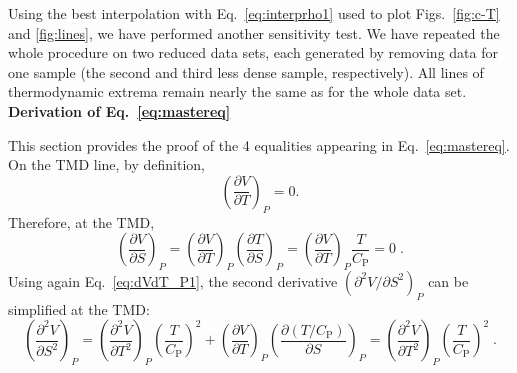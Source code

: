 \documentclass[12pt]{article}
\newcommand{\mrm}{\mathrm}
\newcommand{\CP}{C_\mrm{P}}
\begin{document}
Using the best interpolation with Eq.~\ref{eq:interprho1} used to plot Figs.~\ref{fig:c-T} and \ref{fig:lines}, we have performed another sensitivity test. We have repeated the whole procedure on two reduced data sets, each generated by removing data for one sample (the second and third less dense sample, respectively). All lines of thermodynamic extrema remain nearly the same as for the whole data set.
\\

\textbf{Derivation of Eq.~\ref{eq:mastereq}}

This section provides the proof of the 4 equalities appearing in Eq.~\ref{eq:mastereq}. On the TMD line, by definition,
\begin{equation}
\left( \frac{\partial V}{\partial T} \right)_P = 0 .
\label{eq:dVdT_P1}
\end{equation}
Therefore, at the TMD,
\begin{equation}
\left( \frac{\partial V}{\partial S} \right)_P= \left( \frac{\partial V}{\partial T} \right)_P \left( \frac{\partial T}{\partial S} \right)_P = \left( \frac{\partial V}{\partial T} \right)_P \frac{T}{\CP} = 0\; .
\label{eq:dVdS_P}
\end{equation}
Using again Eq.~\ref{eq:dVdT_P1}, the second derivative $(\partial^2 V/\partial S^2)_P$ can be simplified at the TMD:
\begin{equation}
\left( \frac{\partial^2 V}{\partial S^2} \right)_P= \left( \frac{\partial^2 V}{\partial T^2} \right)_P \left(\frac{T}{\CP}\right)^2 + \left( \frac{\partial V}{\partial T} \right)_P \left( \frac{\partial (T/\CP )}{\partial S} \right)_P = \left( \frac{\partial^2 V}{\partial T^2} \right)_P \left(\frac{T}{\CP}\right)^2 \; .
\label{eq:d2VdS2_P}
\end{equation}
\end{document}
